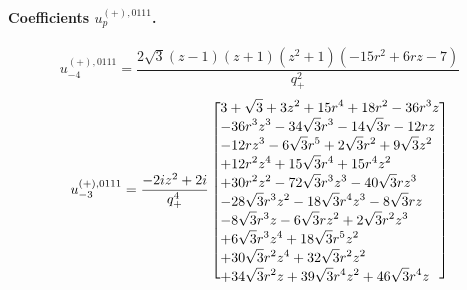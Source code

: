 \documentclass[11pt,a4paper]{article}
\begin{document}
\paragraph{Coefficients $u_p^{(+),0111}$.}
\begin{equation}
u_{-4}^{(+),0111}=\frac{2 \sqrt{3} \left(z - 1\right) \left(z + 1\right) \left(z^{2} + 1\right) \left(- 15 r^{2} + 6 r z - 7\right)}{q_{+}^{2}}
\label{eq:cat-auxiliary-plus-0111-m4}
\end{equation}
\begin{equation}
u_{-3}^{(+),0111}=\frac{- 2 i z^{2} + 2 i}{q_{+}^{4}}\left[\vcenter{\hbox{\shortstack[l]{$\displaystyle 3 + \sqrt{3} + 3 z^{2} + 15 r^{4} + 18 r^{2} - 36 r^{3} z$\\
$\displaystyle  - 36 r^{3} z^{3} - 34 \sqrt{3} r^{3} - 14 \sqrt{3} r - 12 r z$\\
$\displaystyle  - 12 r z^{3} - 6 \sqrt{3} r^{5} + 2 \sqrt{3} r^{2} + 9 \sqrt{3} z^{2}$\\
$\displaystyle  + 12 r^{2} z^{4} + 15 \sqrt{3} r^{4} + 15 r^{4} z^{2}$\\
$\displaystyle  + 30 r^{2} z^{2} - 72 \sqrt{3} r^{3} z^{3} - 40 \sqrt{3} r z^{3}$\\
$\displaystyle  - 28 \sqrt{3} r^{3} z^{2} - 18 \sqrt{3} r^{4} z^{3} - 8 \sqrt{3} r z$\\
$\displaystyle  - 8 \sqrt{3} r^{3} z - 6 \sqrt{3} r z^{2} + 2 \sqrt{3} r^{2} z^{3}$\\
$\displaystyle  + 6 \sqrt{3} r^{3} z^{4} + 18 \sqrt{3} r^{5} z^{2}$\\
$\displaystyle  + 30 \sqrt{3} r^{2} z^{4} + 32 \sqrt{3} r^{2} z^{2}$\\
$\displaystyle  + 34 \sqrt{3} r^{2} z + 39 \sqrt{3} r^{4} z^{2} + 46 \sqrt{3} r^{4} z$}}}\right]
\label{eq:cat-auxiliary-plus-0111-m3}
\end{equation}
\end{document}
